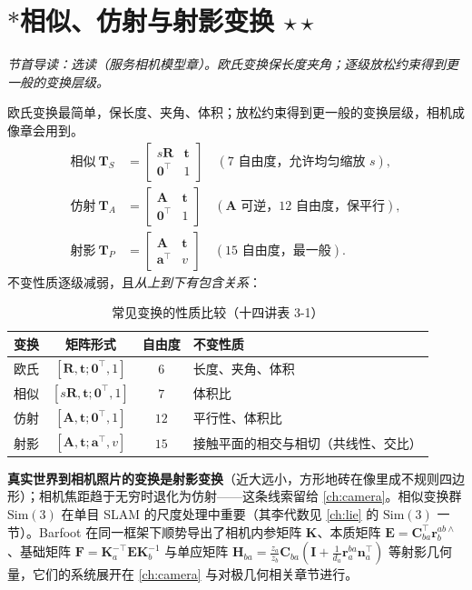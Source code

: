 \section{\texorpdfstring{$*$}{*}相似、仿射与射影变换 \texorpdfstring{$\star\star$}{**}}
\label{sec:rb-projective}
\noindent\emph{节首导读：选读（服务相机模型章）。欧氏变换保长度夹角；逐级放松约束得到更一般的变换层级。}

欧氏变换最简单，保长度、夹角、体积；放松约束得到更一般的变换层级，相机成像章会用到\cite{gaoxiang2019slam14}。
\begin{align}
  \text{相似}\ \mathbf{T}_S&=\begin{bmatrix}s\mathbf{R}&\mathbf{t}\\\mathbf{0}^\top&1\end{bmatrix}\quad(7\text{ 自由度，允许均匀缩放 }s),\\
  \text{仿射}\ \mathbf{T}_A&=\begin{bmatrix}\mathbf{A}&\mathbf{t}\\\mathbf{0}^\top&1\end{bmatrix}\quad(\mathbf{A}\text{ 可逆，}12\text{ 自由度，保平行}),\\
  \text{射影}\ \mathbf{T}_P&=\begin{bmatrix}\mathbf{A}&\mathbf{t}\\\mathbf{a}^\top&v\end{bmatrix}\quad(15\text{ 自由度，最一般}).
\end{align}
不变性质逐级减弱，且\emph{从上到下有包含关系}：
\begin{table}[H]\centering\small
\caption{常见变换的性质比较（十四讲表 3-1）}
\label{tab:rb-transforms}
\begin{tabular}{lccl}
\toprule
变换 & 矩阵形式 & 自由度 & 不变性质 \\
\midrule
欧氏 & $[\mathbf{R},\mathbf{t};\mathbf{0}^\top,1]$ & $6$ & 长度、夹角、体积 \\
相似 & $[s\mathbf{R},\mathbf{t};\mathbf{0}^\top,1]$ & $7$ & 体积比 \\
仿射 & $[\mathbf{A},\mathbf{t};\mathbf{0}^\top,1]$ & $12$ & 平行性、体积比 \\
射影 & $[\mathbf{A},\mathbf{t};\mathbf{a}^\top,v]$ & $15$ & 接触平面的相交与相切（共线性、交比）\\
\bottomrule
\end{tabular}
\end{table}

\noindent\textbf{真实世界到相机照片的变换是射影变换}（近大远小，方形地砖在像里成不规则四边形）；相机焦距趋于无穷时退化为仿射——这条线索留给 \cref{ch:camera}。相似变换群 $\mathrm{Sim}(3)$ 在单目 SLAM 的尺度处理中重要（其李代数见 \cref{ch:lie} 的 $\mathrm{Sim}(3)$ 一节）。Barfoot 在同一框架下顺势导出了相机内参矩阵 $\mathbf{K}$、本质矩阵 $\mathbf{E}=\mathbf{C}_{ba}^\top\mathbf{r}_b^{ab\wedge}$、基础矩阵 $\mathbf{F}=\mathbf{K}_a^{-\top}\mathbf{E}\mathbf{K}_b^{-1}$ 与单应矩阵 $\mathbf{H}_{ba}=\tfrac{z_a}{z_b}\mathbf{C}_{ba}(\mathbf{I}+\tfrac{1}{d_a}\mathbf{r}_a^{ba}\mathbf{n}_a^\top)$ 等射影几何量\cite{barfoot2024state}，它们的系统展开在 \cref{ch:camera} 与对极几何相关章节进行。

